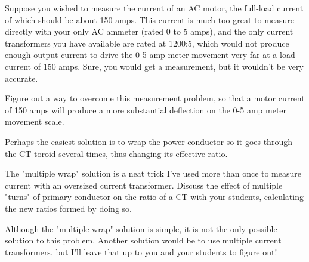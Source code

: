 

Suppose you wished to measure the current of an AC motor, the full-load current of which should be about 150 amps.  This current is much too great to measure directly with your only AC ammeter (rated 0 to 5 amps), and the only current transformers you have available are rated at 1200:5, which would not produce enough output current to drive the 0-5 amp meter movement very far at a load current of 150 amps.  Sure, you would get a measurement, but it wouldn't be very accurate.

Figure out a way to overcome this measurement problem, so that a motor current of 150 amps will produce a more substantial deflection on the 0-5 amp meter movement scale.







Perhaps the easiest solution is to wrap the power conductor so it goes through the CT toroid several times, thus changing its effective ratio.







The "multiple wrap" solution is a neat trick I've used more than once to measure current with an oversized current transformer.  Discuss the effect of multiple "turns" of primary conductor on the ratio of a CT with your students, calculating the new ratios formed by doing so.

Although the "multiple wrap" solution is simple, it is not the only possible solution to this problem.  Another solution would be to use multiple current transformers, but I'll leave that up to you and your students to figure out!



